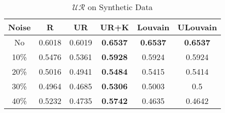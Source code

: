 \documentclass[\main/thesis.tex]{subfiles}
\begin{document}

\begin{table}[]
\centering
\caption{$\mathcal{UR}$ on Synthetic Data}
\label{unsupervised_synthetic}
\begin{tabular}{|c|c|c|c|c|c|}
\hline
Noise & R      & UR     & UR+K            & Louvain         & ULouvain        \\ \hline
No    & 0.6018 & 0.6019 & \textbf{0.6537} & \textbf{0.6537} & \textbf{0.6537} \\ \hline
10\%  & 0.5476 & 0.5361 & \textbf{0.5928} & 0.5924          & 0.5924          \\ \hline
20\%  & 0.5016 & 0.4941 & \textbf{0.5484} & 0.5415          & 0.5414          \\ \hline
30\%  & 0.4964 & 0.4685 & \textbf{0.5306} & 0.5003          & 0.5             \\ \hline
40\%  & 0.5232 & 0.4735 & \textbf{0.5742} & 0.4635          & 0.4642          \\ \hline
\end{tabular}
\end{table}
\end{document}

